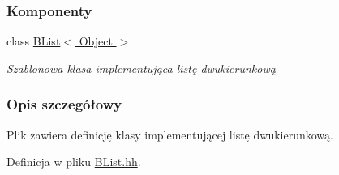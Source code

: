 \subsubsection*{Komponenty}
\begin{DoxyCompactItemize}
\item 
class \hyperlink{class_b_list}{B\-List$<$ Object $>$}
\begin{DoxyCompactList}\small\item\em Szablonowa klasa implementująca listę dwukierunkową \end{DoxyCompactList}\end{DoxyCompactItemize}


\subsubsection{Opis szczegółowy}
Plik zawiera definicję klasy implementującej listę dwukierunkową. 

Definicja w pliku \hyperlink{_b_list_8hh_source}{B\-List.\-hh}.

